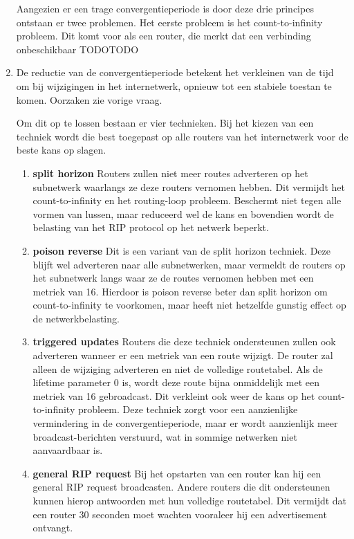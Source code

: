\documentclass{report}
\begin{document}
\begin{enumerate}
Aangezien er een trage convergentieperiode is door deze drie principes ontstaan er twee problemen. Het eerste probleem is het count-to-infinity probleem. Dit komt voor als een router, die merkt dat een verbinding onbeschikbaar TODOTODO

	\item De reductie van de convergentieperiode betekent het verkleinen van de tijd om bij wijzigingen in het internetwerk, opnieuw tot een stabiele toestan te komen. Oorzaken zie vorige vraag.
	
Om dit op te lossen bestaan er vier technieken. Bij het kiezen van een techniek wordt die best toegepast op alle routers van het internetwerk voor de beste kans op slagen.
	\begin{enumerate}
		\item \textbf{split horizon}
		\newline
		Routers zullen niet meer routes adverteren op het subnetwerk waarlangs ze deze routers vernomen hebben. Dit vermijdt het count-to-infinity en het routing-loop probleem. Beschermt niet tegen alle vormen van lussen, maar reduceerd wel de kans en bovendien wordt de belasting van het RIP protocol op het netwerk beperkt.
		\item \textbf{poison reverse}
		\newline
		Dit is een variant van de split horizon techniek. Deze blijft wel adverteren naar alle subnetwerken, maar vermeldt de routers op het subnetwerk langs waar ze de routes vernomen hebben met een metriek van 16. Hierdoor is poison reverse beter dan split horizon om count-to-infinity te voorkomen, maar heeft niet hetzelfde gunstig effect op de netwerkbelasting.
		\item \textbf{triggered updates}
		\newline
		Routers die deze techniek ondersteunen zullen ook adverteren wanneer er een metriek van een route wijzigt. De router zal alleen de wijziging adverteren en niet de volledige routetabel. Als de lifetime parameter 0 is, wordt deze route bijna onmiddelijk met een metriek van 16 gebroadcast. Dit verkleint ook weer de kans op het count-to-infinity probleem. Deze techniek zorgt voor een aanzienlijke vermindering in de convergentieperiode, maar er wordt aanzienlijk meer broadcast-berichten verstuurd, wat in sommige netwerken niet aanvaardbaar is.
		\item \textbf{general RIP request}
		\newline
		Bij het opstarten van een router kan hij een general RIP request broadcasten. Andere routers die dit ondersteunen kunnen hierop antwoorden met hun volledige routetabel. Dit vermijdt dat een router 30 seconden moet wachten vooraleer hij een advertisement ontvangt.

\end{enumerate}
\end{enumerate}
\end{document}
